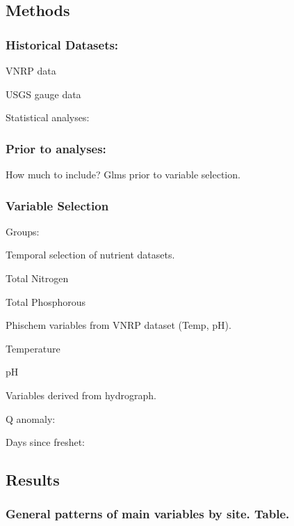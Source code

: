 \documentclass[
]{article}
\begin{document}
\hypertarget{methods}{%
\subsection{Methods}\label{methods}}

\hypertarget{historical-datasets}{%
\subsubsection{Historical Datasets:}\label{historical-datasets}}

VNRP data

USGS gauge data

Statistical analyses:

\hypertarget{prior-to-analyses}{%
\subsubsection{Prior to analyses:}\label{prior-to-analyses}}

How much to include? Glms prior to variable selection.

\hypertarget{variable-selection}{%
\subsubsection{Variable Selection}\label{variable-selection}}

Groups:

Temporal selection of nutrient datasets.

Total Nitrogen

Total Phosphorous

Phischem variables from VNRP dataset (Temp, pH).

Temperature

pH

Variables derived from hydrograph.

Q anomaly:

Days since freshet:

\hypertarget{results}{%
\subsection{Results}\label{results}}

\hypertarget{general-patterns-of-main-variables-by-site.-table.}{%
\subsubsection{General patterns of main variables by site.
Table.}\label{general-patterns-of-main-variables-by-site.-table.}}
\end{document}
